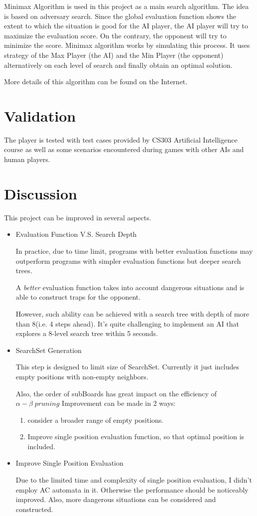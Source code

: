 \documentclass[conference]{IEEEtran}
\begin{document}
Minimax Algorithm is used in this project as a main search algorithm. The idea is based on adversary search. Since the global evaluation function shows the extent to which the situation is good for the AI player, the AI player will try to maximize the evaluation score. On the contrary, the opponent will try to minimize the score. Minimax algorithm works by simulating this process. It uses strategy of the Max Player (the AI) and the Min Player (the opponent) alternatively on each level of search and finally obtain an optimal solution.\cite{wiki1}

More details of this algorithm can be found on the Internet. 

\section{Validation}
	The player is tested with test cases provided by CS303 Artificial Intelligence course as well as some scenarios encountered during games with other AIs and human players. 
\section{Discussion}
This project can be improved in several aspects.
\begin{itemize}
\item Evaluation Function V.S. Search Depth
    
In practice, due to time limit, programs with better evaluation functions may outperform programs with simpler evaluation functions but deeper search trees.

A \emph{better} evaluation function takes into account dangerous situations and is able to construct traps for the opponent.

However, such ability can be achieved with a search tree with depth of more than 8(i.e. 4 steps ahead). It's quite challenging to implement an AI that explores a 8-level search tree within 5 seconds.

\item SearchSet Generation

This step is designed to limit size of SearchSet. Currently it just includes empty positions with non-empty neighbors. 

Also, the order of subBoards has great impact on the efficiency of $\alpha-\beta \;pruning$
Improvement can be made in 2 ways: 
\begin{enumerate}
    \item consider a broader range of empty positions.
    \item Improve single position evaluation function, so that optimal position is included.
\end{enumerate}
\item Improve Single Position Evaluation

Due to the limited time and complexity of single position evaluation, I didn't employ AC automata in it. Otherwise the performance should be noticeably improved. Also, more dangerous situations can be considered and constructed.
\end{itemize}
\end{document}
